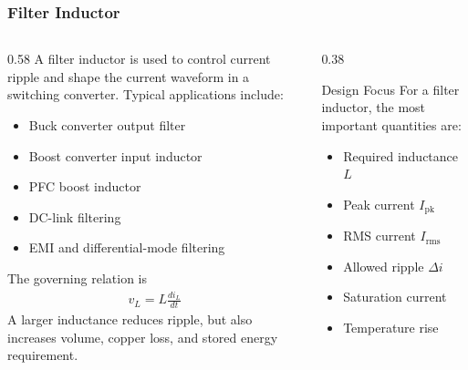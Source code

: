 \begin{frame}
    \frametitle{Filter Inductor}

    \begin{columns}
        \begin{column}{0.58\textwidth}
            A filter inductor is used to control current ripple and shape the current waveform in a switching converter. Typical applications include:
            \begin{itemize}
                \item Buck converter output filter
                \item Boost converter input inductor
                \item PFC boost inductor
                \item DC-link filtering
                \item EMI and differential-mode filtering
            \end{itemize}
            The governing relation is
            \begin{align}
                v_L = L\frac{di_L}{dt}
            \end{align}
            A larger inductance reduces ripple, but also increases volume, copper loss, and stored energy requirement.
        \end{column}

        \begin{column}{0.38\textwidth}
            \begin{block}{Design Focus}
                \small
                For a filter inductor, the most important quantities are:
                \begin{itemize}
                    \item Required inductance $L$
                    \item Peak current $I_{\mathrm{pk}}$
                    \item RMS current $I_{\mathrm{rms}}$
                    \item Allowed ripple $\Delta i$
                    \item Saturation current
                    \item Temperature rise
                \end{itemize}
            \end{block}
        \end{column}
    \end{columns}
\end{frame}


